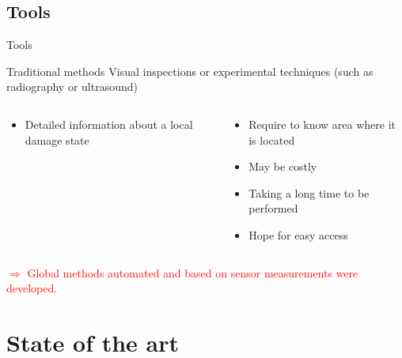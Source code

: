 \documentclass{beamer}
\begin{document}
\subsection{Tools}
\begin{frame}{Tools}
\begin{block}{Traditional methods}
Visual inspections or experimental techniques (such as radiography or ultrasound)
\end{block}

\begin{columns}
		\begin{column}{0.5\textwidth} 
		\begin{center}
			\begin{itemize}
				\item Detailed information about a local damage state
			\end{itemize}
		\end{center}
		\end{column}
		\begin{column}{0.5\textwidth}
		\begin{center}
			\begin{itemize}
				\item Require to know area where it is located
				\item May be costly
				\item Taking a long time to be performed
				\item Hope for easy access
			\end{itemize}
		\end{center}
		\end{column}
	\end{columns}
	\pause
	\begin{center}
	\textcolor{red}{{\large 
$\Rightarrow$ Global methods automated and based on sensor measurements were developed.}}
	
	\end{center}

\end{frame}


\section{State of the art}
\end{document}
